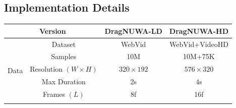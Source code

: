 \documentclass{article} %
\begin{document}
\subsection{Implementation Details}
\begin{table}[]
\renewcommand{\arraystretch}{1.1}
\begin{tabular}{|p{0.65cm}p{3.05cm}|p{4.0cm} p{4.0cm}|}
\hline
\multicolumn{2}{|c|}{Version}                                                           & \multicolumn{1}{c|}{DragNUWA-LD}                                                                                                             & \multicolumn{1}{c|}{DragNUWA-HD}                                                                                                                    \\ \hline
\multicolumn{1}{|c|}{\multirow{6}{*}{Data}}                    & \multicolumn{1}{c|}{Dataset}                & \multicolumn{1}{c|}{WebVid}                                                                                                   & \multicolumn{1}{c|}{WebVid+VideoHD}                                                                                       \\ \cline{2-4} 
\multicolumn{1}{|c|}{}                                         & \multicolumn{1}{c|}{Samples}                & \multicolumn{1}{c|}{10M}                                                                                                            & \multicolumn{1}{c|}{10M+75K}                                                                                                             \\ \cline{2-4} 
\multicolumn{1}{|c|}{}                                         & \multicolumn{1}{c|}{Resolution $(W\times H)$}       & \multicolumn{1}{c|}{$320\times 192$}                                                                                                        & \multicolumn{1}{c|}{$576\times 320$}                                                                                                             \\ \cline{2-4} 
\multicolumn{1}{|c|}{}                                         & \multicolumn{1}{c|}{Max Duration}      & \multicolumn{1}{c|}{2s}                                                                                                             & \multicolumn{1}{c|}{4s}                                                                                                                  \\ \cline{2-4} 
\multicolumn{1}{|c|}{}                                         & \multicolumn{1}{c|}{Frames $(L)$}             & \multicolumn{1}{c|}{8f}                                                                                                             & \multicolumn{1}{c|}{16f}                                                                                                                 \\ \cline{2-4} 

\end{tabular}
\end{table}
\end{document}
